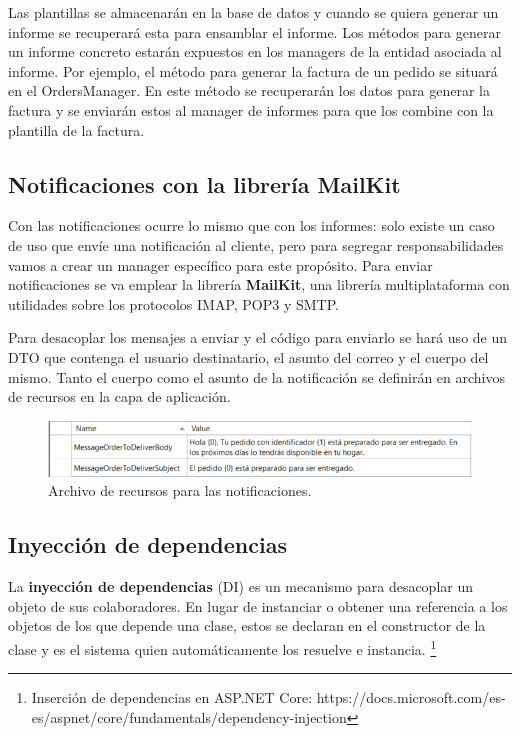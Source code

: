 \documentclass[11pt,spanish,listoffigures]{tfgetsinf}
\begin{document}
Las plantillas se almacenarán en la base de datos y cuando se quiera generar un informe se recuperará esta para ensamblar el informe. Los métodos para generar un informe concreto estarán expuestos en los managers de la entidad asociada al informe. Por ejemplo, el método para generar la factura de un pedido se situará en el OrdersManager. En este método se recuperarán los datos para generar la factura y se enviarán estos al manager de informes para que los combine con la plantilla de la factura.

\subsection{Notificaciones con la librería MailKit}

Con las notificaciones ocurre lo mismo que con los informes: solo existe un caso de uso que envíe una notificación al cliente, pero para segregar responsabilidades vamos a crear un manager específico para este propósito. Para enviar notificaciones se va emplear la librería \textbf{MailKit}, una librería multiplataforma con utilidades sobre los protocolos IMAP, POP3 y SMTP.

Para desacoplar los mensajes a enviar y el código para enviarlo se hará uso de un DTO que contenga el usuario destinatario, el asunto del correo y el cuerpo del mismo. Tanto el cuerpo como el asunto de la notificación se definirán en archivos de recursos en la capa de aplicación.

\begin{figure}[h]
\centering
\includegraphics[scale=1]{NotificationsMessage}
\caption{Archivo de recursos para las notificaciones.}
\end{figure}

\subsection{Inyección de dependencias}

La \textbf{inyección de dependencias} (DI) es un mecanismo para desacoplar un objeto de sus colaboradores. En lugar de instanciar o obtener una referencia a los objetos de los que depende una clase, estos se declaran en el constructor de la clase y es el sistema quien automáticamente los resuelve e instancia. \footnote{ Inserción de dependencias en ASP.NET Core: https://docs.microsoft.com/es-es/aspnet/core/fundamentals/dependency-injection} 
\end{document}
